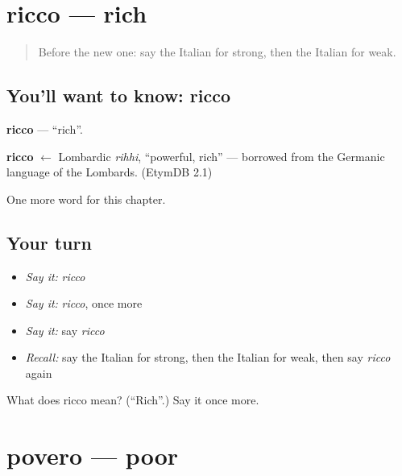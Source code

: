 \section[ricco]{ricco — rich}

\label{lesson:IT-C76-ricco}



\begin{quote}
Before the new one: say the Italian for strong, then the Italian for weak.
\end{quote}

\subsection*{You'll want to know: ricco}
\textbf{ricco} — \textquotedblleft{}rich\textquotedblright{}.

\begin{cousinweb}
\textbf{ricco} $\leftarrow$ Lombardic \emph{rihhi}, \textquotedblleft{}powerful, rich\textquotedblright{} — borrowed from the Germanic language of the Lombards. (EtymDB 2.1)
\end{cousinweb}

\begin{grammarlens}[title={What you've built}]
One more word for this chapter.
\end{grammarlens}

\subsection*{Your turn}
\begin{itemize}
\raggedright
  \item \emph{Say it:} \emph{ricco}
  \item \emph{Say it:} \emph{ricco}, once more
  \item \emph{Say it:} say \emph{ricco}
  \item \emph{Recall:} say the Italian for strong, then the Italian for weak, then say \emph{ricco} again
\end{itemize}

\begin{tcolorbox}[breakable,colback=teal!4,colframe=teal!35!black,title={Before you move on}]
What does ricco mean? (\textquotedblleft{}Rich\textquotedblright{}.) Say it once more.
\end{tcolorbox}
\section[povero]{povero — poor}

